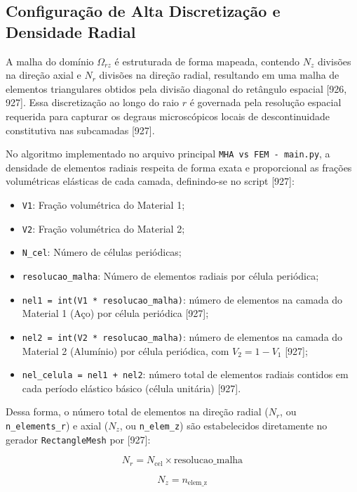 \subsection{Configuração de Alta Discretização e Densidade Radial}

A malha do domínio $\Omega_{rz}$ é estruturada de forma mapeada, contendo $N_z$ divisões na direção axial e $N_r$ divisões na direção radial, resultando em uma malha de elementos triangulares obtidos pela divisão diagonal do retângulo espacial [926, 927]. Essa discretização ao longo do raio $r$ é governada pela resolução espacial requerida para capturar os degraus microscópicos locais de descontinuidade constitutiva nas subcamadas [927].

No algoritmo implementado no arquivo principal \texttt{MHA vs FEM - main.py}, a densidade de elementos radiais respeita de forma exata e proporcional as frações volumétricas elásticas de cada camada, definindo-se no script [927]:
\begin{itemize}
  \item \texttt{V1}: Fração volumétrica do Material 1;
  \item \texttt{V2}: Fração volumétrica do Material 2;
  \item \texttt{N\_cel}: Número de células periódicas;
  \item \texttt{resolucao\_malha}: Número de elementos radiais por célula periódica;
  \item \texttt{nel1 = int(V1 * resolucao\_malha)}: número de elementos na camada do Material 1 (Aço) por célula periódica [927];
  \item \texttt{nel2 = int(V2 * resolucao\_malha)}: número de elementos na camada do Material 2 (Alumínio) por célula periódica, com $V_2 = 1 - V_1$ [927];
  \item \texttt{nel\_celula = nel1 + nel2}: número total de elementos radiais contidos em cada período elástico básico (célula unitária) [927].
\end{itemize}

Dessa forma, o número total de elementos na direção radial ($N_r$, ou \texttt{n\_elements\_r}) e axial ($N_z$, ou \texttt{n\_elem\_z}) são estabelecidos diretamente no gerador \texttt{RectangleMesh} por [927]:

\begin{equation}
  N_r = N_{\text{cel}} \times \text{resolucao\_malha}
  \label{eq:nr_mef_v3}
\end{equation}

\begin{equation}
  N_z = n_{\text{elem\_z}}
  \label{eq:nz_mef_v3}
\end{equation}

